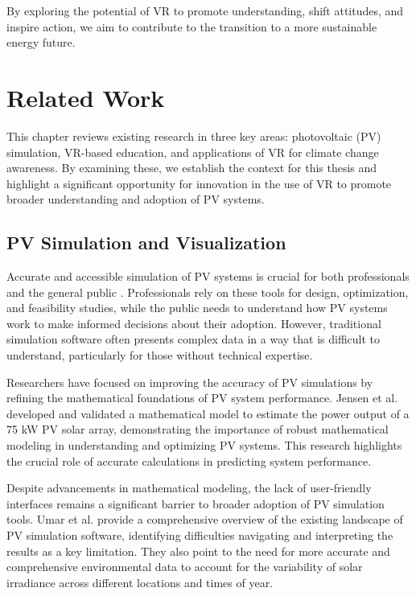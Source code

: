 \documentclass[draft, final]{vutinfth} %
\begin{document}
By exploring the potential of VR to promote understanding, shift attitudes, and inspire action, we aim to contribute to the transition to a more sustainable energy future.

\chapter{Related Work}

This chapter reviews existing research in three key areas: photovoltaic (PV) simulation, VR-based education, and applications of VR for climate change awareness. By examining these, we establish the context for this thesis and highlight a significant opportunity for innovation in the use of VR to promote broader understanding and adoption of PV systems.

\section{PV Simulation and Visualization}

Accurate and accessible simulation of PV systems is crucial for both professionals and the general public \cite{Milosavljevic2022SimTools}. Professionals rely on these tools for design, optimization, and feasibility studies, while the public needs to understand how PV systems work to make informed decisions about their adoption. However, traditional simulation software often presents complex data in a way that is difficult to understand, particularly for those without technical expertise.

Researchers have focused on improving the accuracy of PV simulations by refining the mathematical foundations of PV system performance. Jensen et al. \cite{Jensen2010Model} developed and validated a mathematical model to estimate the power output of a 75 kW PV solar array, demonstrating the importance of robust mathematical modeling in understanding and optimizing PV systems. This research highlights the crucial role of accurate calculations in predicting system performance.

Despite advancements in mathematical modeling, the lack of user-friendly interfaces remains a significant barrier to broader adoption of PV simulation tools. Umar et al. \cite{Umar2018PvSimSoftware} provide a comprehensive overview of the existing landscape of PV simulation software, identifying difficulties navigating and interpreting the results as a key limitation. They also point to the need for more accurate and comprehensive environmental data to account for the variability of solar irradiance across different locations and times of year.
\end{document}
